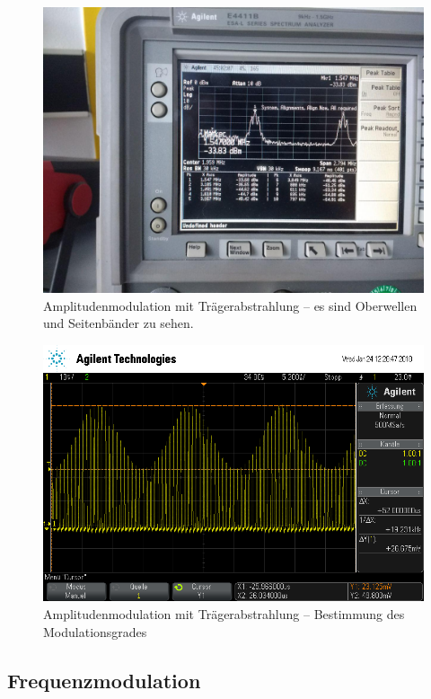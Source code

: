 \begin{figure}
	\centering
	\includegraphics[width=\textwidth]{img/Aufgabenteil_c1.jpg}
	\caption{Amplitudenmodulation mit Trägerabstrahlung -- es sind Oberwellen und Seitenbänder zu sehen.}
	\label{c1}
\end{figure}

\begin{figure}
	\centering
	\includegraphics[width=\textwidth]{img/c_scope_247.png}
	\caption{Amplitudenmodulation mit Trägerabstrahlung -- Bestimmung des Modulationsgrades}
	\label{c2}
\end{figure}

\subsection{Frequenzmodulation}

